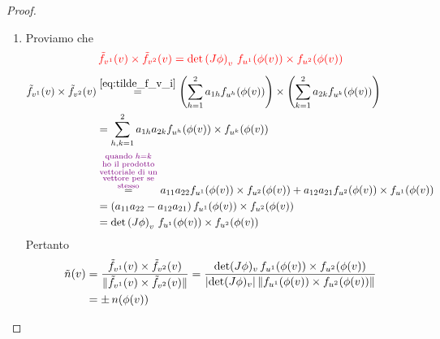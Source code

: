 \begin{proof}
\begin{enumerate}
\begin{align*}
            \end{align*}
            \begin{equation}
            \label{eq:tilde_f_v_i}
            \tilde{f}_{v^i}(v) =  \sum_{k=1}^{2} a_{ik} f_{u^k}(\phi(v))
            \end{equation}
            $\Rightarrow \left(J \phi\right)_v$ è la matrice di passaggio da $\left( f_{u^i}(\phi(v)) \right)_{i=1,2}$ a $\left(\tilde{f}_{v^i}(v)\right)_{i=1,2}$.
            \item Proviamo che 
            \[ \color{red} \tilde{f}_{v^1} (v) \times \tilde{f}_{v^2} (v) = \det \left( J \phi \right)_v \, f_{u^1}(\phi(v)) \times f_{u^2}(\phi(v)) \]
            \begin{align*}
            \tilde{f}_{v^1}(v) \times \tilde{f}_{v^2}(v) &\overset{\eqref{eq:tilde_f_v_i}}{=} \left( \sum_{h=1}^{2} a_{1h} f_{u^h}(\phi(v)) \right) \times \left( \sum_{k=1}^{2} a_{2k} f_{u^k}(\phi(v)) \right) \\
            &= \sum_{h,k=1}^{2} a_{1h} a_{2k} f_{u^h}(\phi(v)) \times f_{u^k}(\phi(v)) \\ 
            &\overset{\textcolor{violet}{\substack{\text{quando } h=k \\ \text{ho il prodotto} \\ \text{vettoriale di un} \\ \text{vettore per se} \\ \text{stesso}}}}{=} a_{11} a_{22} f_{u^1}(\phi(v)) \times f_{u^2}(\phi(v)) + a_{12} a_{21} f_{u^2}(\phi(v)) \times f_{u^1}(\phi(v)) \\
            &= (a_{11} a_{22} - a_{12} a_{21}) \, f_{u^1}(\phi(v)) \times f_{u^2}(\phi(v)) \\
            &= \det \left( J \phi \right)_v \, f_{u^1}(\phi(v)) \times f_{u^2}(\phi(v))
            \end{align*}
            Pertanto 
            \begin{align*}
            \tilde{n}(v) &= \frac{\tilde{f}_{v^1}(v) \times \tilde{f}_{v^2}(v)}{\lVert\tilde{f}_{v^1}(v) \times \tilde{f}_{v^2}(v)\rVert} = \frac{\det (J \phi)_v \,  f_{u^1}(\phi(v)) \times f_{u^2}(\phi(v))}{\lvert\det (J \phi)_v\rvert \, \lVert f_{u^1}(\phi(v)) \times f_{u^2}(\phi(v))\rVert} \\
            &= \pm \, n(\phi(v))
            \end{align*}
        \end{enumerate}
        \end{proof}
